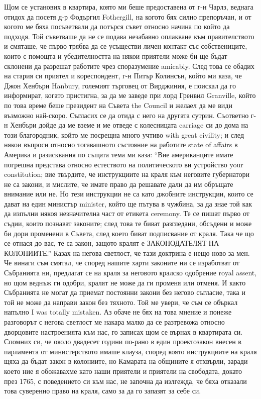\documentclass[12pt]{book}
\begin{document}
Щом се установих в квартира, която ми беше предоставена от г-н Чарлз, веднага отидох да посетя д-р Фодъргил Fothergill, на когото бях силно препоръчан, и от когото ме бяха посъветвали да потърся съвет относно начина по който да подходя. Той съветваше да не се подава незабавно оплакване към правителството и смяташе, че първо трябва да се усъществи личен контакт със собствениците, които с помощта и убедителността на някои приятели може би ще бъдат склонени да разрешат работите чрез споразумение amicably. След това се обадих на стария си приятел и кореспондент, г-н Питър Колинсън, който ми каза, че Джон Хенбъри Hanbury, големият търговец от Вирджиния, е поискал да го информират, когато пристигна, за да ме заведе при лорд Гренвил Granville, който по това време беше президент на Съвета the Council и желаел да ме види възможно най-скоро. Съгласих се да отида с него на другата сутрин. Съответно г-н Хенбъри дойде да ме вземе и ме отведе с колесницата carriage си до дома на този благородник, който ме посрещна много учтиво with great civility; и след някои въпроси относно тогавашното състояние на работите state of affairs в Америка и разисквания по същата тема ми каза: “Вие американците имате погрешна представа относно естеството на политическото ви устройство your constitution; вие твърдите, че инструкциите на краля към неговите губернатори не са закони, и мислите, че имате право да решавате дали да им обръщате внимание или не. Но тези инструкции не са като джобните инструкции, които се дават на един министър minister, който ще пътува в чужбина, за да знае той как да изпълни някоя незначителна част от етикета ceremony. Те се пишат първо от съдии, които познават законите; след това те биват разгледани, обсъдени и може би дори променени в Съвета, след което биват подписвание от краля. Така че що се отнася до вас, те са закон, защото кралят е ЗАКОНОДАТЕЛЯТ НА КОЛОНИИТЕ.” Казах на негова светлост, че тази доктрина е нещо ново за мен. Че винаги съм смятал, че според нашите харти законите ни се изработват от Събранията ни, предлагат се на краля за неговото кралско одобрение royal assent, но щом веднъж ги одобри, кралят не може да ги променя или отменя. И както Събранията не могат да приемат постоянни закони без негово съгласие, така и той не може да направи закон без тяхното. Той ме увери, че съм се объркал напълно I was totally mistaken. Аз обаче не бях на това мнение и понеже разговорът с негова светлост ме накара малко да се разтревожа относно дворцовите настроенията към нас, го записах щом се върнах в квартирата си. Спомних си, че около двадесет години по-рано в един проектозакон внесен в парламента от министерството имаше клауза, според която инструкциите на краля щяха да бъдат закон в колониите, но Камарата на общините я отхвърли, заради което ние я обожавахме като наши приятели и приятели на свободата, докато през 1765, с поведението си към нас, не започна да излгежда, че бяха отказали това суверенно право на краля, само за да го запазят за себе си.
\end{document}
